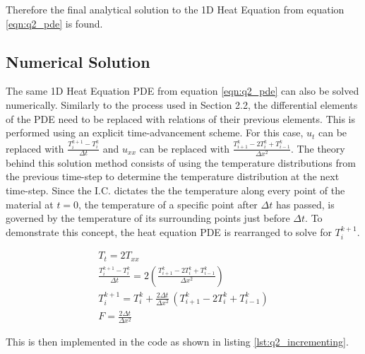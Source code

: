 \documentclass[12pt]{article}
\begin{document}
\noindent Therefore the final analytical solution to the 1D Heat Equation from equation \ref{eqn:q2_pde} is found.

\subsection{Numerical Solution}

The same 1D Heat Equation PDE from equation \ref{eqn:q2_pde} can also be solved numerically. Similarly to the process used in Section 2.2, the differential elements of the PDE need to be replaced with relations of their previous elements. This is performed using an explicit time-advancement scheme. For this case, $u_t$ can be replaced with $\frac{T_{i}^{k+1} - T_i^k}{\Delta t}$ and $u_{xx}$ can be replaced with $\frac{T_{i+1}^{k} - 2 T_i^k + T_{i-1}^k}{\Delta x^2}$. The theory behind this solution method consists of using the temperature distributions from the previous time-step to determine the temperature distribution at the next time-step. Since the I.C. dictates the the temperature along every point of the material at $t = 0$, the temperature of a specific point after $\Delta t$ has passed, is governed by the temperature of its surrounding points just before $\Delta t$. To demonstrate this concept, the heat equation PDE is rearranged to solve for $T_{i}^{k+1}$.

\begin{equation}
    \label{eqn:q2_numerical_soln}
    \begin{gathered}
        T_t = 2 T_{xx} \\
        \frac{T_i^{k+1} - T_i^k}{\Delta t} = 2 \left( \frac{T_{i+1}^k - 2 T_i^k + T_{i-1}^k}{\Delta x^2} \right) \\
        T_i^{k+1} = T_i^k + \frac{2 \Delta t}{\Delta x^2} \, \left(T_{i+1}^k - 2 T_i^k + T_{i-1}^k \right) \\
        F = \frac{2 \Delta t}{\Delta x^2}
    \end{gathered}
\end{equation}

\noindent This is then implemented in the code as shown in listing \ref{lst:q2_incrementing}.


\end{document}
